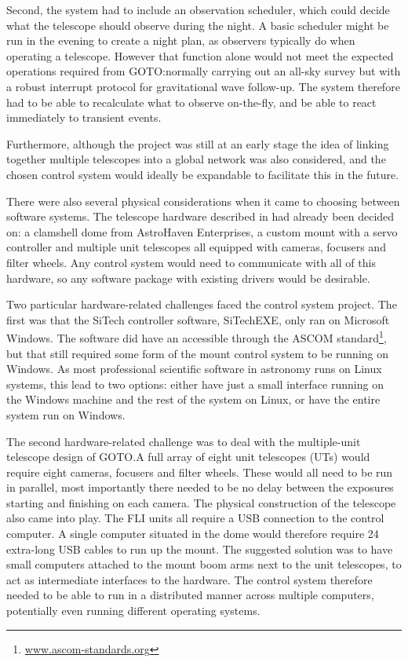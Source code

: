 \begin{colsection}
\begin{colsection}
Second, the system had to include an observation scheduler, which could decide what the telescope should observe during the night. A basic scheduler might be run in the evening to create a night plan, as observers typically do when operating a telescope. However that function alone would not meet the expected operations required from GOTO:\@ normally carrying out an all-sky survey but with a robust interrupt protocol for gravitational wave follow-up. The system therefore had to be able to recalculate what to observe on-the-fly, and be able to react immediately to transient  events.

Furthermore, although the project was still at an early stage the idea of linking together multiple telescopes into a global network was also considered, and the chosen control system would ideally be expandable to facilitate this in the future.

There were also several physical considerations when it came to choosing between software systems. The telescope hardware described in  had already been decided on: a clamshell dome from AstroHaven Enterprises, a custom mount with a  servo controller and multiple unit telescopes all equipped with  cameras, focusers and filter wheels. Any control system would need to communicate with all of this hardware, so any software package with existing drivers would be desirable.

Two particular hardware-related challenges faced the control system project. The first was that the SiTech controller software, SiTechEXE, only ran on Microsoft Windows. The software did have an accessible  through the ASCOM standard\footnote{\url{www.ascom-standards.org}}, but that still required some form of the mount control system to be running on Windows. As most professional scientific software in astronomy runs on Linux systems, this lead to two options: either have just a small interface running on the Windows machine and the rest of the system on Linux, or have the entire system run on Windows.

The second hardware-related challenge was to deal with the multiple-unit telescope design of GOTO.\@ A full array of eight unit telescopes (UTs) would require eight cameras, focusers and filter wheels. These would all need to be run in parallel, most importantly there needed to be no delay between the exposures starting and finishing on each camera. The physical construction of the telescope also came into play. The FLI units all require a USB connection to the control computer. A single computer situated in the dome would therefore require 24 extra-long USB cables to run up the mount. The suggested solution was to have small computers attached to the mount boom arms next to the unit telescopes, to act as intermediate interfaces to the hardware. The control system therefore needed to be able to run in a distributed manner across multiple computers, potentially even running different operating systems.


\end{colsection}
\end{colsection}
